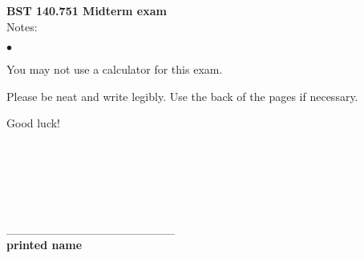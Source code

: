 \documentclass[12pt]{article}
\begin{document}
\noindent
{\bf BST 140.751 Midterm exam} \\
Notes:
\begin{list}{$\bullet$}{}
\item You may not use a calculator for this exam.
\item Please be neat and write legibly. Use the back of the pages if necessary.
\item Good luck!
\end{list}
\ \\ \ \\ \ \\ \ \\ \ \\
 \_\_\_\_\_\_\_\_\_\_\_\_\_\_\_\_\_\_\_\_ \\
{\bf printed name}

\newpage
\end{document}
